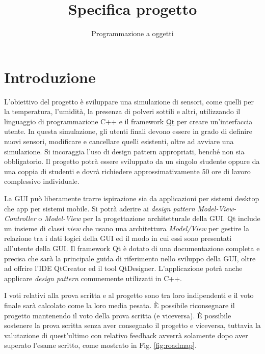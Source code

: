 \documentclass[10pt,a4paper,oneside]{article}
\title{Specifica progetto}
\author{Programmazione a oggetti}
\begin{document}
\maketitle

\section{Introduzione}
L'obiettivo del progetto è sviluppare una simulazione di sensori, come quelli per la temperatura, l'umidità, la presenza di polveri sottili e altri, utilizzando il linguaggio di programmazione C++ e il framework \href{https://www.qt.io/?hsLang=en}{Qt} per creare un'interfaccia utente. In questa simulazione, gli utenti finali devono essere in grado di definire nuovi sensori, modificare e cancellare quelli esistenti, oltre ad avviare una simulazione. Si incoraggia l'uso di design pattern appropriati, benché non sia obbligatorio. Il progetto potrà essere sviluppato da un singolo studente oppure da una coppia di studenti e dovrà richiedere approssimativamente 50 ore di lavoro complessivo individuale.

La GUI può liberamente trarre ispirazione sia da applicazioni per sistemi desktop che app per sistemi mobile. Si potrà aderire ai \emph{design pattern} \emph{Model-View-Controller} o \emph{Model-View} per la progettazione architetturale della GUI. Qt include un insieme di classi \emph{view} che usano una architettura \emph{Model/View} per gestire la relazione tra i dati logici della GUI ed il modo in cui essi sono presentati all'utente della GUI. Il framework Qt è dotato di una documentazione completa e precisa che sarà la principale guida di riferimento nello sviluppo della GUI, oltre ad offrire l'IDE QtCreator ed il tool QtDesigner. L'applicazione potrà anche applicare \emph{design pattern} comunemente utilizzati in C++.

I voti relativi alla prova scritta e al progetto sono tra loro indipendenti e il voto finale sarà calcolato come la loro media pesata. È possibile riconsegnare il progetto mantenendo il voto della prova scritta (e viceversa). È possibile sostenere la prova scritta senza aver consegnato il progetto e viceversa, tuttavia la valutazione di quest'ultimo con relativo feedback avverrà solamente dopo aver superato l'esame scritto, come mostrato in Fig. \ref{fig:roadmap}.
\end{document}
